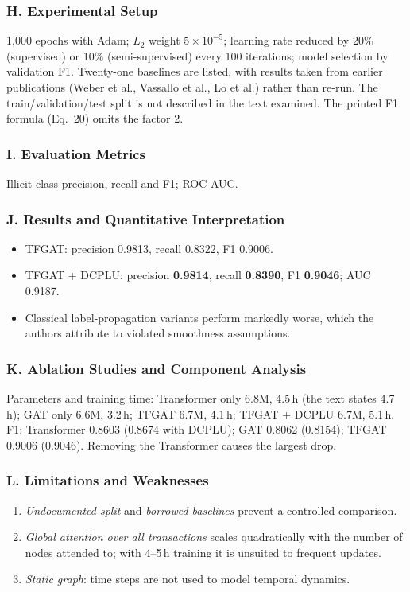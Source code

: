 \documentclass[11pt,a4paper]{article}
\begin{document}
\subsubsection*{H. Experimental Setup}
1,000 epochs with Adam; $L_2$ weight $5\times10^{-5}$; learning rate reduced by 20\% (supervised) or 10\% (semi-supervised) every 100 iterations; model selection by validation F1. Twenty-one baselines are listed, with results taken from earlier publications (Weber et al., Vassallo et al., Lo et al.) rather than re-run. The train/validation/test split is not described in the text examined. The printed F1 formula (Eq.~20) omits the factor 2.

\subsubsection*{I. Evaluation Metrics}
Illicit-class precision, recall and F1; ROC-AUC.

\subsubsection*{J. Results and Quantitative Interpretation}
\begin{itemize}[leftmargin=*]
    \item TFGAT: precision 0.9813, recall 0.8322, F1 0.9006.
    \item TFGAT + DCPLU: precision \textbf{0.9814}, recall \textbf{0.8390}, F1 \textbf{0.9046}; AUC 0.9187.
    \item Classical label-propagation variants perform markedly worse, which the authors attribute to violated smoothness assumptions.
\end{itemize}

\subsubsection*{K. Ablation Studies and Component Analysis}
Parameters and training time: Transformer only 6.8M, 4.5\,h (the text states 4.7\,h); GAT only 6.6M, 3.2\,h; TFGAT 6.7M, 4.1\,h; TFGAT + DCPLU 6.7M, 5.1\,h. F1: Transformer 0.8603 (0.8674 with DCPLU); GAT 0.8062 (0.8154); TFGAT 0.9006 (0.9046). Removing the Transformer causes the largest drop.

\subsubsection*{L. Limitations and Weaknesses}
\begin{enumerate}[leftmargin=*]
    \item \textit{Undocumented split} and \textit{borrowed baselines} prevent a controlled comparison.
    \item \textit{Global attention over all transactions} scales quadratically with the number of nodes attended to; with 4--5\,h training it is unsuited to frequent updates.
    \item \textit{Static graph}: time steps are not used to model temporal dynamics.
\end{enumerate}
\end{document}
